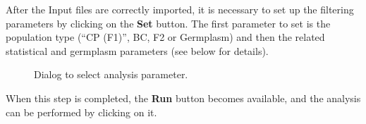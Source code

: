 \documentclass[a4paper,11pt,english]{article}
\begin{document}
After the Input files are correctly imported, it is necessary to set up the filtering parameters
by clicking on the \textbf{Set} button. The first parameter to set is the population type
(``CP (F1)'', BC, F2 or Germplasm) and then the related statistical and germplasm parameters
(see below for details).
\begin{figure}[H]
\centering
\capstart

\caption{Dialog to select analysis parameter.}\end{figure}

When this step is completed, the \textbf{Run} button becomes available, and the analysis can be
performed by clicking on it.
\end{document}
